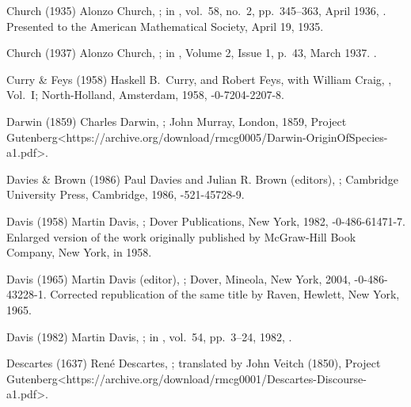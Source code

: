 
\biblabel Church (1935)
Alonzo Church,
;
in ,
vol.\ 58, no.\ 2, pp.\ 345--363, April 1936,
.
Presented to the American Mathematical Society,
April 19, 1935.

\biblabel Church (1937)
Alonzo Church,
;
in ,
Volume 2, Issue 1, p.~43, March 1937.
.

\biblabel Curry \& Feys (1958)
Haskell B.\ Curry, and
Robert Feys, with
William  Craig,
, Vol.\ I;
North-Holland, Amsterdam, 1958,
-0-7204-2207-8.

\biblabel Darwin (1859)
Charles Darwin,
;
John Murray, London, 1859,
\URL Project Gutenberg<https://archive.org/download/rmcg0005/Darwin-OriginOfSpecies-a1.pdf>.

\biblabel Davies \& Brown (1986)
Paul Davies and Julian R. Brown (editors),
;
Cambridge University Press, Cambridge, 1986,
-521-45728-9.

\biblabel Davis (1958)
Martin Davis,
;
Dover Publications, New York, 1982,
-0-486-61471-7.
Enlarged version of the work originally published
by McGraw-Hill Book Company, New York, in 1958.

\biblabel Davis (1965)
Martin Davis (editor),
;
Dover, Mineola, New York, 2004,
-0-486-43228-1.
Corrected republication of the same title
by Raven, Hewlett, New York, 1965.

\biblabel Davis (1982)
Martin Davis,
;
in ,
vol.\ 54, pp.\ 3--24, 1982,
.

\biblabel Descartes (1637)
René Descartes,
;
translated by John Veitch (1850),
\URL Project Gutenberg<https://archive.org/download/rmcg0001/Descartes-Discourse-a1.pdf>.

